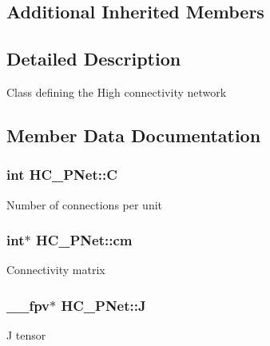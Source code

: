 \subsection*{Additional Inherited Members}


\subsection{Detailed Description}
Class defining the High connectivity network 

\subsection{Member Data Documentation}
\subsubsection[{\texorpdfstring{C}{C}}]{\setlength{\rightskip}{0pt plus 5cm}int H\+C\+\_\+\+P\+Net\+::C\hspace{0.3cm}{\ttfamily [private]}}\hypertarget{classHC__PNet_a40f377e7056967c60f966101eb986035}{}\label{classHC__PNet_a40f377e7056967c60f966101eb986035}
Number of connections per unit 
\subsubsection[{\texorpdfstring{cm}{cm}}]{\setlength{\rightskip}{0pt plus 5cm}int$\ast$ H\+C\+\_\+\+P\+Net\+::cm\hspace{0.3cm}{\ttfamily [private]}}\hypertarget{classHC__PNet_a151d918ab156eda6394ecea56aa1b513}{}\label{classHC__PNet_a151d918ab156eda6394ecea56aa1b513}
Connectivity matrix 
\subsubsection[{\texorpdfstring{J}{J}}]{\setlength{\rightskip}{0pt plus 5cm}\+\_\+\+\_\+fpv$\ast$ H\+C\+\_\+\+P\+Net\+::J\hspace{0.3cm}{\ttfamily [private]}}\hypertarget{classHC__PNet_a30c13f798fbcea6d617d09e8f06b7151}{}\label{classHC__PNet_a30c13f798fbcea6d617d09e8f06b7151}
J tensor 
